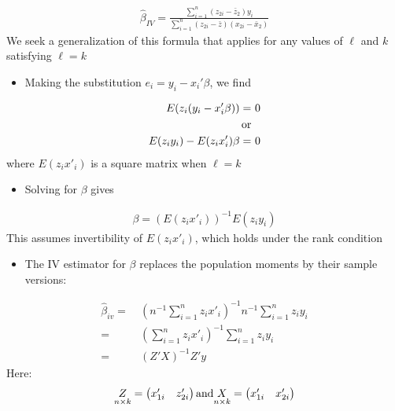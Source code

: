 \documentclass[a4paper,twoside,11pt]{article}
\begin{document}
\begin{equation*}
\begin{aligned}
\hat{\beta}_{IV} = \frac{\sum^n_{i=1}(z_{2i}- \bar z_2)y_i}{\sum^n_{i=1}(z_{2i} - \bar z)(x_{2i} - \bar x_2)}
\end{aligned} 
\end{equation*}
We seek a generalization of this formula that applies for any values of $\ell$ and $k$ satisfying $\ell = k$
\begin{itemize}
    \item Making the substitution $e_i = y_i - x_i' \beta$, we find
\end{itemize}
\begin{equation*}
\begin{aligned}
E(z_i (y_i - x'_i \beta)) =& \  0 \\
\textmd{or} \\
E(z_i y_i) - E(z_i x'_i)\beta =& \  0
\end{aligned} 
\end{equation*}
where $E(z_i x'_i)$ is a square matrix when $\ell = k$
\begin{itemize}
    \item Solving for $\beta$ gives
\end{itemize}
\begin{equation*}
\begin{aligned}
\beta = (E(z_i x'_i))^{-1} E(z_i y_i)
\end{aligned} 
\end{equation*}
This assumes invertibility of $E(z_i x'_i)$, which holds under the rank condition
\begin{itemize}
    \item The IV estimator for $\beta$ replaces the population moments by their sample versions:
\end{itemize}
\begin{equation*}
\begin{aligned}
\hat{\beta}_{iv} =& \  (n^{-1} \sum^n_{i=1} z_i x'_i)^{-1} n^{-1} \sum^n_{i=1} z_i y_i \\
=& \  (\sum^n_{i=1} z_i x'_i)^{-1} \sum^n_{i=1} z_i y_i \\
=& \ (Z'X)^{-1} Z' y
\end{aligned} 
\end{equation*}
Here:
\begin{equation*}
\begin{aligned}
\underset{n \times k}{Z} = \begin{pmatrix}
x'_{1i} & z'_{2i}
\end{pmatrix} \textmd{and} \underset{n \times k}{X} = \begin{pmatrix}
x_{1i}' & x'_{2i}
\end{pmatrix}
\end{aligned} 
\end{equation*}
\end{document}
